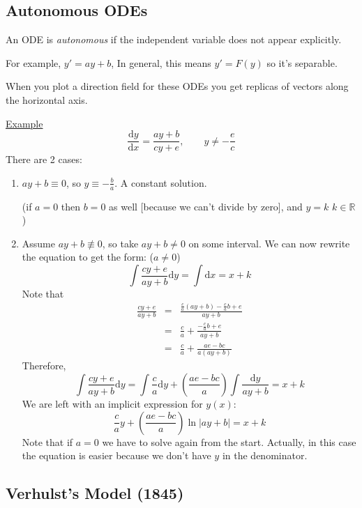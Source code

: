 \documentclass{article}
\newcommand{\mathd}{\mathrm{d}}
\newcommand{\nequiv}{\mathrel{\not\equiv}}
\newcommand{\tmem}[1]{{\em #1\/}}
\newcommand{\tmtextbf}[1]{\text{{\bfseries{#1}}}}
\newenvironment{enumeratenumeric}{\begin{enumerate}[1.] }{\end{enumerate}}
\begin{document}
\subsection{Autonomous ODEs}

\tmtextbf{Definition:} An ODE is {\tmem{autonomous}} if the independent
variable does not appear explicitly.

For example, $y' = ay + b$, In general, this means $y' = F (y)$ so it's
separable.

When you plot a direction field for these ODEs you get replicas of vectors
along the horizontal axis.

{\underline{Example}}
\[ \frac{\mathd y}{\mathd x} = \frac{ay + b}{cy + e}, \qquad y \neq -
   \frac{e}{c} \]
There are 2 cases:
\begin{enumeratenumeric}
  \item $ay + b \equiv 0$, so $y \equiv - \frac{b}{a}$. A constant solution.
  
  (if $a = 0$ then $b = 0$ as well [because we can't divide by zero], and $y =
  k$ {\forall}$k \in \mathbb{R}$)
  
  \item Assume $ay + b \nequiv 0$, so take $ay + b \neq 0$ on some interval.
  We can now rewrite the equation to get the form: ($a \neq 0$)
  \[ \int \frac{cy + e}{ay + b} \mathd y = \int \mathd x = x + k \]
  Note that
  \begin{eqnarray*}
    \frac{cy + e}{ay + b} & = & \frac{\frac{c}{a} (ay + b) - \frac{c}{a} b +
    e}{ay + b}\\
    & = & \frac{c}{a} + \frac{- \frac{c}{a} b + e}{ay + b}\\
    & = & \frac{c}{a} + \frac{ae - bc}{a (ay + b)}
  \end{eqnarray*}
  Therefore,
  \[ \int \frac{cy + e}{ay + b} \mathd y = \int \frac{c}{a} \mathd y + \left(
     \frac{ae - bc}{a} \right)  \int \frac{\mathd y}{ay + b} = x + k \]
  We are left with an implicit expression for $y (x)$:
  \[ \  \]
  \[ \frac{c}{a} y + \left( \frac{ae - bc}{a} \right) \ln | ay + b | = x + k
  \]
  Note that if $a = 0$ we have to solve again from the start. Actually, in
  this case the equation is easier because we don't have $y$ in the
  denominator.
\end{enumeratenumeric}

\subsection{Verhulst's Model (1845)}
\end{document}
